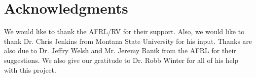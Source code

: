 \documentclass[]{aiaa-tc}%
\begin{document}
\section{Acknowledgments}

We would like to thank the AFRL/RV for their support. Also, we would like to thank Dr. Chris Jenkins from Montana State University for his input. Thanks are also due to Dr. Jeffry Welsh and Mr. Jeremy Banik from the AFRL for their suggestions. We also give our gratitude to Dr. Robb Winter for all of his help with this project. 

{}

\end{document}
